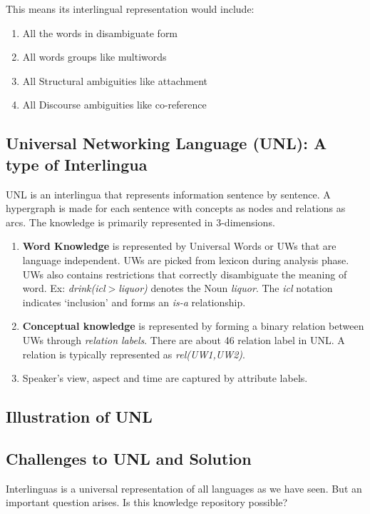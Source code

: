     This means its interlingual representation would include\cite{bhattacharyya}:
    \begin{enumerate}
        \item All the words in disambiguate form
        \item All words groups like multiwords
        \item All Structural ambiguities like attachment 
        \item All Discourse ambiguities like co-reference
    \end{enumerate}
    
    \subsection{Universal Networking Language (UNL): A type of Interlingua}
    UNL is an interlingua that represents information sentence by sentence. A hypergraph is made for each sentence with concepts as nodes and relations as arcs. The knowledge is primarily represented in 3-dimensions.
    \begin{enumerate}
        \item \textbf{Word Knowledge} is represented by Universal Words or UWs that are language independent. UWs are picked from lexicon during analysis phase. UWs also contains restrictions that correctly disambiguate the meaning of word. Ex: \textit{drink(icl$>$liquor)} denotes the Noun \textit{liquor}. The \textit{icl} notation indicates `inclusion' and forms an \textit{is-a} relationship.
        
        \item \textbf{Conceptual knowledge} is represented by forming a binary relation between UWs through \textit{relation labels}. There are about \num{46} relation label in UNL. A relation is typically represented as \textit{rel(UW1,UW2)}.
        
        \item Speaker's view, aspect and time are captured by attribute labels.
    \end{enumerate}
    
    \subsection{Illustration of UNL}
    \subsection{Challenges to UNL and Solution}
    Interlinguas is a universal representation of all languages as we have seen. But an important question arises. Is this knowledge repository possible? 

